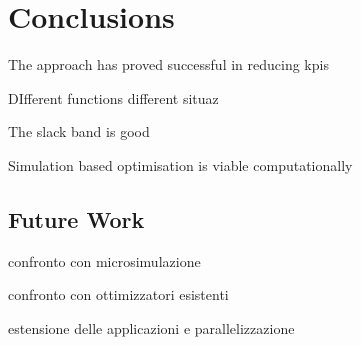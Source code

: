 \chapter{Conclusions} \label{c:conclusions}

The approach has proved successful in reducing kpis

DIfferent functions different situaz

The slack band is good

Simulation based optimisation is viable computationally


\section{Future Work}
confronto con microsimulazione

confronto con ottimizzatori esistenti

estensione delle applicazioni e parallelizzazione